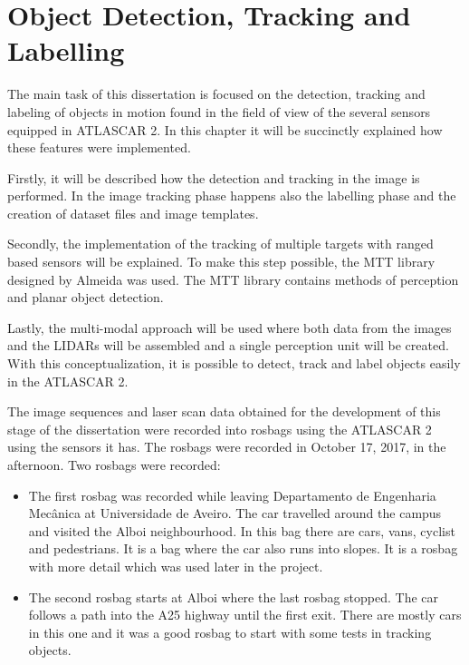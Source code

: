 \chapter{Object Detection, Tracking and Labelling}

The main task of this dissertation is focused on the detection, tracking and labeling of objects in motion found in the field of view of the several sensors equipped in ATLASCAR 2. In this chapter it will be succinctly explained how these features were implemented. 

Firstly, it will be described how the detection and tracking in the image is performed. In the image tracking phase happens also the labelling phase and the creation of dataset files and image templates. 

Secondly, the implementation of the tracking of multiple targets with ranged based sensors will be explained. To make this step possible, the MTT library designed by Almeida \cite{SoaresDeAlmeida2016a} was used. The MTT library contains methods of perception and planar object detection. 

Lastly, the multi-modal approach will be used where both data from the images and the LIDARs will be assembled and a single perception unit will be created. With this conceptualization, it is possible to detect, track and label objects easily in the ATLASCAR 2.

The image sequences and laser scan data obtained for the development of this stage of the dissertation were recorded into rosbags using the ATLASCAR 2 using the sensors it has. The rosbags were recorded in October 17, 2017, in the afternoon. Two rosbags were recorded:

\begin{itemize}
	\item The first rosbag was recorded while leaving Departamento de Engenharia Mec\^anica at Universidade de Aveiro. The car travelled around the campus and visited the Alboi neighbourhood.
	\subitem In this bag there are cars, vans, cyclist and pedestrians. It is a bag where the car also runs into slopes. It is a rosbag with more detail which was used later in the project.
	\item The second rosbag starts at Alboi where the last rosbag stopped. The car follows a path into the A25 highway until the first exit.
	\subitem There are mostly cars in this one and it was a good rosbag to start with some tests in tracking objects.
\end{itemize} 

